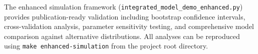 \documentclass{article}
\begin{document}
The enhanced simulation framework (\texttt{integrated\_model\_demo\_enhanced.py}) provides publication-ready 
validation including bootstrap confidence intervals, cross-validation analysis, parameter sensitivity testing, 
and comprehensive model comparison against alternative distributions. All analyses can be reproduced using 
\texttt{make enhanced-simulation} from the project root directory.



\end{document}
